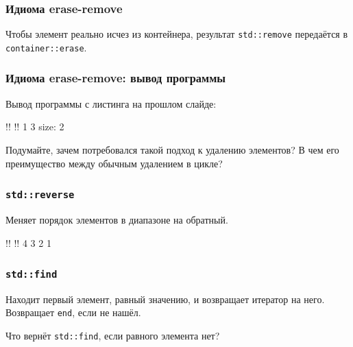 \documentclass[compress, 8pt, aspectratio=169]{beamer}
\begin{document}
  \begin{frame}[fragile]

    \frametitle{Идиома erase-remove}

    Чтобы элемент реально исчез из контейнера,
    результат \texttt{std::remove} передаётся
    в \texttt{container::erase}.


  \end{frame}

  \begin{frame}[fragile]

    \frametitle{Идиома erase-remove: вывод программы}

    Вывод программы с листинга на прошлом слайде:

    \begin{terminalwindow}
!!
!!
1 3
size: 2
    \end{terminalwindow}

    \begin{task}
      Подумайте, зачем потребовался такой подход к удалению элементов?
      В чем его преимущество между обычным удалением в цикле?
    \end{task}

  \end{frame}

  \begin{frame}[fragile]

    \frametitle{\texttt{std::reverse}}

    Меняет порядок элементов в диапазоне на обратный.


    \begin{terminalwindow}
!!
!!
4 3 2 1
    \end{terminalwindow}

  \end{frame}

  \begin{frame}[fragile]

    \frametitle{\texttt{std::find}}

    Находит первый элемент, равный значению,
    и возвращает итератор на него.
    Возвращает \texttt{end}, если не нашёл.


    \begin{task}
      Что вернёт \texttt{std::find}, если равного элемента нет?
    \end{task}

  \end{frame}
\end{document}
